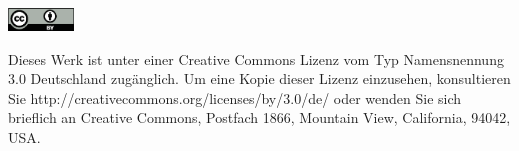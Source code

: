 

\vfill
\noindent\includegraphics[width=0.13\textwidth]{img/by.eps}

\noindent Dieses Werk ist unter einer Creative Commons Lizenz vom Typ Namensnennung 3.0 Deutschland zugänglich. Um eine Kopie dieser Lizenz einzusehen, konsultieren Sie http://creativecommons.org/licenses/by/3.0/de/ oder wenden Sie sich brieflich an Creative Commons, Postfach 1866, Mountain View, California, 94042, USA.
